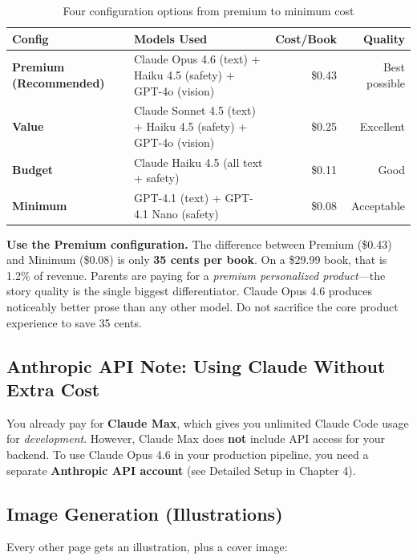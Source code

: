\documentclass[12pt, letterpaper, oneside]{book}
\begin{document}
\begin{table}[H]
\centering
\small
\begin{tabularx}{\textwidth}{lXrr}
\toprule
\textbf{Config} & \textbf{Models Used} & \textbf{Cost/Book} & \textbf{Quality} \\
\midrule
\textbf{Premium (Recommended)} & Claude Opus 4.6 (text) + Haiku 4.5 (safety) + GPT-4o (vision) & \$0.43 & Best possible \\
\textbf{Value} & Claude Sonnet 4.5 (text) + Haiku 4.5 (safety) + GPT-4o (vision) & \$0.25 & Excellent \\
\textbf{Budget} & Claude Haiku 4.5 (all text + safety) & \$0.11 & Good \\
\textbf{Minimum} & GPT-4.1 (text) + GPT-4.1 Nano (safety) & \$0.08 & Acceptable \\
\bottomrule
\end{tabularx}
\caption{Four configuration options from premium to minimum cost}
\end{table}

\begin{warningbox}
\textbf{Use the Premium configuration.} The difference between Premium (\$0.43) and Minimum (\$0.08) is only \textbf{35 cents per book}. On a \$29.99 book, that is 1.2\% of revenue. Parents are paying for a \textit{premium personalized product}---the story quality is the single biggest differentiator. Claude Opus 4.6 produces noticeably better prose than any other model. Do not sacrifice the core product experience to save 35 cents.
\end{warningbox}

\subsection{Anthropic API Note: Using Claude Without Extra Cost}

You already pay for \textbf{Claude Max}, which gives you unlimited Claude Code usage for \textit{development}. However, Claude Max does \textbf{not} include API access for your backend. To use Claude Opus 4.6 in your production pipeline, you need a separate \textbf{Anthropic API account} (see Detailed Setup in Chapter 4).

\subsection{Image Generation (Illustrations)}

Every other page gets an illustration, plus a cover image:
\end{document}
